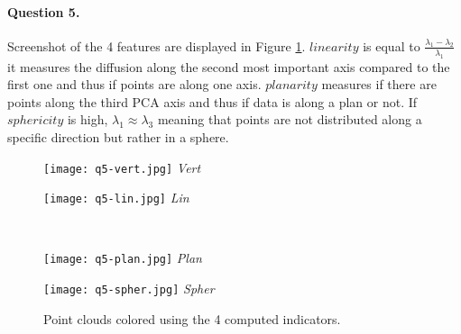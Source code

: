 \documentclass[french]{article}
\begin{document}
\paragraph{Question 5.} 
Screenshot of the 4 features are displayed in Figure \ref{fig:q5}. $linearity$ is equal to $\frac{\lambda_1-\lambda_2}{\lambda_1}$ it measures the diffusion along the second most important axis compared to the first one and thus if points are along one axis. $planarity$ measures if there are points along the third PCA axis and thus if data is along a plan or not. If $sphericity$ is high, $\lambda_1\approx\lambda_3$ meaning that points are not distributed along a specific direction but rather in a sphere.
\begin{figure}[h]
	\centering
	\begin{minipage}{0.49\linewidth}
		\centering
		\texttt{[image: q5-vert.jpg]}
		\textit{Vert}
	\end{minipage}\hfill
	\begin{minipage}{0.49\linewidth}
		\centering
		\texttt{[image: q5-lin.jpg]}
		\textit{Lin}
	\end{minipage}\\

		\begin{minipage}{0.49\linewidth}
		\centering
		\texttt{[image: q5-plan.jpg]}
		\textit{Plan}
	\end{minipage}\hfill
	\begin{minipage}{0.49\linewidth}
		\centering
		\texttt{[image: q5-spher.jpg]}
		\textit{Spher}
	\end{minipage}
	\caption{Point clouds colored using the 4 computed indicators.}
	\label{fig:q5}
\end{figure}
\end{document}
